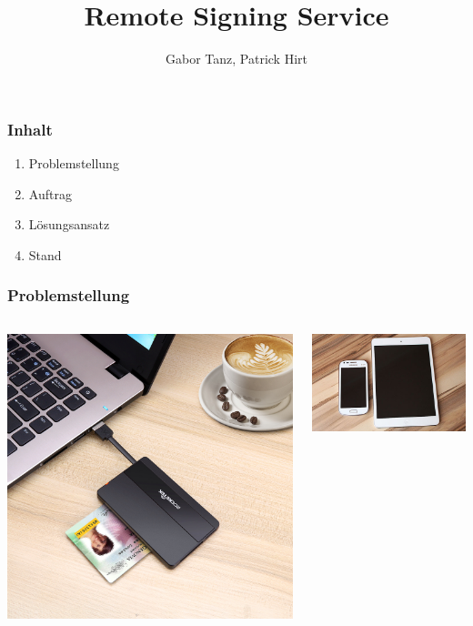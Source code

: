 \documentclass[12pt,xcolor=pdftex,dvipsnames,table]{beamer}
\title{Remote Signing Service}
\author{Gabor Tanz, Patrick Hirt}
\begin{document}
    \begin{frame}
        \titlepage
    \end{frame}

    \begin{frame}
        \frametitle{Inhalt}
        \begin{enumerate}
            \item Problemstellung
            \item Auftrag
            \item Lösungsansatz
            \item Stand
        \end{enumerate}
    \end{frame}

    \begin{frame}
        \frametitle{Problemstellung}
        \begin{columns}[T]
            \begin{column}{0.5\textwidth}
                \includegraphics[width=\textwidth]{images/cardreader.jpg}
            \end{column}
            \begin{column}{0.5\textwidth}
                \includegraphics[width=\textwidth]{images/tablet-smartphone.jpg}

\end{column}
\end{columns}
\end{frame}
\end{document}
